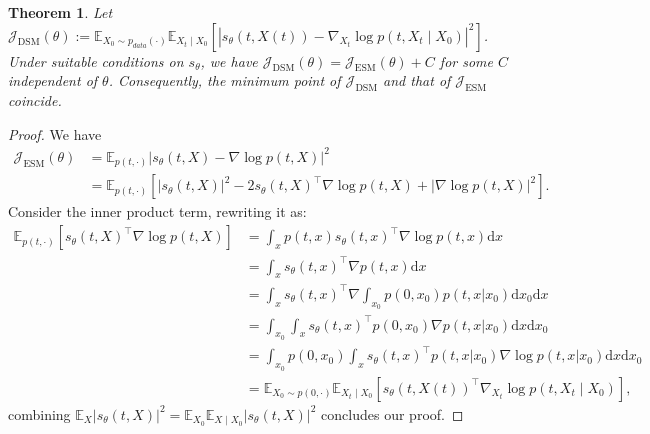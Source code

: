 \documentclass[letterpaper,10pt,reqno]{amsart}
\newtheorem{theorem}{Theorem}
\numberwithin{equation}{section}
\begin{document}
\begin{theorem}
\label{thm:DSM}
Let 
$\mathcal{J}_{\text{DSM}}(\theta):= \mathbb{E}_{X_0\sim p_{data}(\cdot)} \mathbb{E}_{X_t \mid X_0}\left[\left|s_{\theta}(t,X(t))-\nabla_{X_t} \log p(t,X_t \mid X_0)\right|^2\right]$.
Under suitable conditions on $s_\theta$, we have 
$\mathcal{J}_{\text{DSM}}(\theta) = \mathcal{J}_{\text{ESM}}(\theta) + C$ for some $C$ independent of $\theta$. 
Consequently, the minimum point of $\mathcal{J}_{\text{DSM}}$ and that of $\mathcal{J}_{\text{ESM}}$ coincide. 
\end{theorem}
\begin{proof}
We have 
\begin{equation*}
\begin{aligned}
\mathcal{J}_{\text{ESM}}(\theta) 
& = \mathbb{E}_{p(t, \cdot)} |s_\theta(t,X) - \nabla \log p(t,X)|^2\\
& = \mathbb{E}_{p(t, \cdot)} \left[|s_\theta(t,X)|^2 - 2 s_\theta(t,X)^{\top}\nabla \log p(t,X)+|\nabla \log p(t,X)|^2\right].
\end{aligned}
\end{equation*}
Consider the inner product term, rewriting it as:
\begin{equation*}
\begin{aligned}
\mathbb{E}_{p(t, \cdot)} \left[s_\theta(t,X)^{\top}\nabla \log p(t,X)\right]& = \int_{x}p(t,x)s_\theta(t,x)^{\top}\nabla \log p(t,x) \mathrm{d}x\\
& = \int_{x}s_\theta(t,x)^{\top}\nabla p(t,x) \mathrm{d}x\\
& = \int_{x}
s_\theta(t,x)^{\top}\nabla 
\int_{x_0}p(0,x_0)p(t,x|x_0)\mathrm{d}x_0 \mathrm{d}x\\
& = \int_{x_0}\int_{x}
s_\theta(t,x)^{\top} 
p(0,x_0)\nabla p(t,x|x_0)\mathrm{d}x\mathrm{d}x_0 \\
& = \int_{x_0}p(0,x_0)\int_{x}
s_\theta(t,x)^{\top} 
p(t,x|x_0) \nabla \log p(t,x|x_0)\mathrm{d}x\mathrm{d}x_0\\
& = \mathbb{E}_{X_0\sim p(0,\cdot)} \mathbb{E}_{X_t \mid X_0} \left[s_{\theta}(t,X(t))^{\top}\nabla_{X_t} \log p(t,X_t \mid X_0)\right],
\end{aligned}
\end{equation*}
combining $\mathbb{E}_{X} |s_\theta(t,X)|^2=\mathbb{E}_{X_0} \mathbb{E}_{X \mid X_0}|s_\theta(t,X)|^2$ concludes our proof.
\end{proof}
\end{document}
